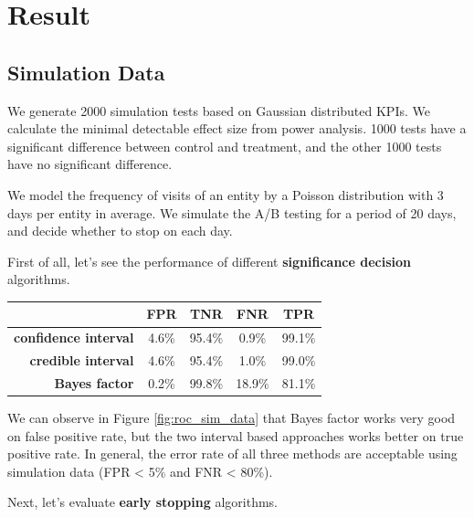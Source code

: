 \documentclass[paper=a4, fontsize=11pt]{scrartcl} %
\numberwithin{equation}{section} %
\numberwithin{figure}{section} %
\numberwithin{table}{section} %
\begin{document}
\section{Result}

\subsection{Simulation Data}
We generate 2000 simulation tests based on Gaussian distributed KPIs. We calculate the minimal detectable effect size from power analysis. 1000 tests have a significant difference between control and treatment, and the other 1000 tests have no significant difference. 

We model the frequency of visits of an entity by a Poisson distribution with 3 days per entity in average. We simulate the A/B testing for a period of 20 days, and decide whether to stop on each day.

First of all, let's see the performance of different \textbf{significance decision} algorithms.
\begin{center}
  \begin{tabular}{ | r | c | c | c | c | }
    \hline
    & FPR & TNR & FNR & TPR \\ \hline
    \textbf{confidence interval} & 4.6\% & 95.4\% & 0.9\% & 99.1\% \\ \hline
    \textbf{credible interval} & 4.6\% & 95.4\% & 1.0\% & 99.0\% \\ \hline
    \textbf{Bayes factor} & 0.2\% & 99.8\% & 18.9\% & 81.1\%\\
    \hline
  \end{tabular}
\end{center}

We can observe in Figure \ref{fig:roc_sim_data} that Bayes factor works very good on false positive rate, but the two interval based approaches works better on true positive rate. In general, the error rate of all three methods are acceptable using simulation data (FPR < 5\% and FNR < 80\%). 


Next, let's evaluate \textbf{early stopping} algorithms.
\end{document}
